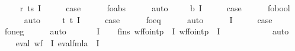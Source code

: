 \begin{isabellebody}
\ \ \isamarkupfalse%
\ {\isacharparenleft}{\kern0pt}{}\ r\ ts\ I{\isacharparenright}{\kern0pt}\isanewline
\ \ \isamarkupfalse%
\ \isamarkupfalse%
\ {\isacharquery}{\kern0pt}case\isanewline
\ \ \ \ \isamarkupfalse%
\ fo{\isacharunderscore}{\kern0pt}abs\isanewline
\ \ \ \ \isamarkupfalse%
\ auto\isanewline
{}\isamarkupfalse%
\isanewline
\ \ \isamarkupfalse%
\ {\isacharparenleft}{\kern0pt}{}\ b\ I{\isacharparenright}{\kern0pt}\isanewline
\ \ \isamarkupfalse%
\ \isamarkupfalse%
\ {\isacharquery}{\kern0pt}case\isanewline
\ \ \ \ \isamarkupfalse%
\ fo{\isacharunderscore}{\kern0pt}bool\isanewline
\ \ \ \ \isamarkupfalse%
\ auto\isanewline
{}\isamarkupfalse%
\isanewline
\ \ \isamarkupfalse%
\ {\isacharparenleft}{\kern0pt}{}\ t\ t{\isacharprime}{\kern0pt}\ I{\isacharparenright}{\kern0pt}\isanewline
\ \ \isamarkupfalse%
\ \isamarkupfalse%
\ {\isacharquery}{\kern0pt}case\isanewline
\ \ \ \ \isamarkupfalse%
\ fo{\isacharunderscore}{\kern0pt}eq\isanewline
\ \ \ \ \isamarkupfalse%
\ auto\isanewline
{}\isamarkupfalse%
\isanewline
\ \ \isamarkupfalse%
\ {\isacharparenleft}{\kern0pt}{}\ {\isasymphi}\ I{\isacharparenright}{\kern0pt}\isanewline
\ \ \isamarkupfalse%
\ \isamarkupfalse%
\ {\isacharquery}{\kern0pt}case\isanewline
\ \ \ \ \isamarkupfalse%
\ fo{\isacharunderscore}{\kern0pt}neg\isanewline
\ \ \ \ \isamarkupfalse%
\ auto\isanewline
{}\isamarkupfalse%
\isanewline
\ \ \isamarkupfalse%
\ {\isacharparenleft}{\kern0pt}{}\ {\isasymphi}\ {\isasympsi}\ I{\isacharparenright}{\kern0pt}\isanewline
\ \ \isamarkupfalse%
\ fins{\isacharcolon}{\kern0pt}\ {\isachardoublequoteopen}wf{\isacharunderscore}{\kern0pt}fo{\isacharunderscore}{\kern0pt}intp\ {\isasymphi}\ I{\isachardoublequoteclose}\ {\isachardoublequoteopen}wf{\isacharunderscore}{\kern0pt}fo{\isacharunderscore}{\kern0pt}intp\ {\isasympsi}\ I{\isachardoublequoteclose}\isanewline
\ \ \ \ \isamarkupfalse%
\ {}{\isacharparenleft}{\kern0pt}{}{}{\isacharparenright}{\kern0pt}\isanewline
\ \ \ \ \isamarkupfalse%
\ auto\isanewline
\ \ \isamarkupfalse%
\ eval{\isasymphi}{\isacharcolon}{\kern0pt}\ {\isachardoublequoteopen}wf\ {\isasymphi}\ I\ {\isacharparenleft}{\kern0pt}eval{\isacharunderscore}{\kern0pt}fmla\ {\isasymphi}\ I{\isacharparenright}{\kern0pt}{\isachardoublequoteclose}\isanewline

\end{isabellebody}
